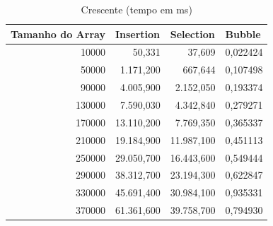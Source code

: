 \documentclass[a4paper, 12pt]{article}
\begin{document}
\begin{longtable}[c]{@{}rrrr@{}}
	\caption{Crescente (tempo em ms)}
	\label{tab:crescente1-table}\\
	\toprule
	\multicolumn{1}{l}{\textbf{Tamanho do Array}} & \multicolumn{1}{l}{\textbf{Insertion}} & \multicolumn{1}{l}{\textbf{Selection}} & \multicolumn{1}{l}{\textbf{Bubble}} \\* \midrule
	\endfirsthead
	\endhead
	\multicolumn{1}{|r|}{10000}                   & \multicolumn{1}{r|}{50,331}            & \multicolumn{1}{r|}{37,609}            & \multicolumn{1}{r|}{0,022424}       \\* \midrule
	\multicolumn{1}{|r|}{50000}                   & \multicolumn{1}{r|}{1.171,200}         & \multicolumn{1}{r|}{667,644}           & \multicolumn{1}{r|}{0,107498}       \\* \midrule
	\multicolumn{1}{|r|}{90000}                   & \multicolumn{1}{r|}{4.005,900}         & \multicolumn{1}{r|}{2.152,050}         & \multicolumn{1}{r|}{0,193374}       \\* \midrule
	\multicolumn{1}{|r|}{130000}                  & \multicolumn{1}{r|}{7.590,030}         & \multicolumn{1}{r|}{4.342,840}         & \multicolumn{1}{r|}{0,279271}       \\* \midrule
	\multicolumn{1}{|r|}{170000}                  & \multicolumn{1}{r|}{13.110,200}        & \multicolumn{1}{r|}{7.769,350}         & \multicolumn{1}{r|}{0,365337}       \\* \midrule
	\multicolumn{1}{|r|}{210000}                  & \multicolumn{1}{r|}{19.184,900}        & \multicolumn{1}{r|}{11.987,100}        & \multicolumn{1}{r|}{0,451113}       \\* \midrule
	\multicolumn{1}{|r|}{250000}                  & \multicolumn{1}{r|}{29.050,700}        & \multicolumn{1}{r|}{16.443,600}        & \multicolumn{1}{r|}{0,549444}       \\* \midrule
	\multicolumn{1}{|r|}{290000}                  & \multicolumn{1}{r|}{38.312,700}        & \multicolumn{1}{r|}{23.194,300}        & \multicolumn{1}{r|}{0,622847}       \\* \midrule
	\multicolumn{1}{|r|}{330000}                  & \multicolumn{1}{r|}{45.691,400}        & \multicolumn{1}{r|}{30.984,100}        & \multicolumn{1}{r|}{0,935331}       \\* \midrule
	\multicolumn{1}{|r|}{370000}                  & \multicolumn{1}{r|}{61.361,600}        & \multicolumn{1}{r|}{39.758,700}        & \multicolumn{1}{r|}{0,794930}       \\* \midrule

\end{longtable}
\end{document}
